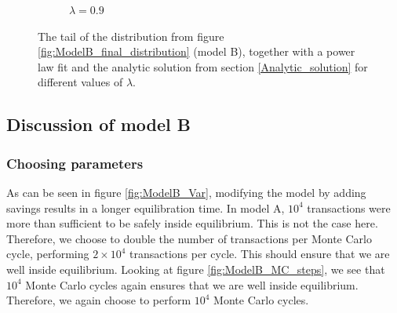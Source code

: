 \documentclass[a4paper, 10pt]{article}
\begin{document}
\begin{figure}[!ht]
\begin{subfigure}[H!]{0.5\textwidth}
        \caption{$\lambda = 0.9$}\label{fig:ModelB_tail_lamb_09}
    \end{subfigure}
\caption{The tail of the distribution from figure \ref{fig:ModelB_final_distribution} (model B), together with a power law fit and the analytic solution from section \ref{Analytic_solution} for different values of $\lambda$.}\label{fig:ModelB_tail}
\end{figure} 

\subsection{Discussion of model B}
\subsubsection{Choosing parameters}
As can be seen in figure \ref{fig:ModelB_Var}, modifying the model by adding savings results in a longer equilibration time. In model A, $10^4$ transactions were more than sufficient to be safely inside equilibrium. This is not the case here. Therefore, we choose to double the number of transactions per Monte Carlo cycle, performing $2\times 10^4$ transactions per cycle. This should ensure that we are well inside equilibrium. Looking at figure \ref{fig:ModelB_MC_steps}, we see that $10^4$ Monte Carlo cycles again ensures that we are well inside equilibrium. Therefore, we again choose to perform $10^4$ Monte Carlo cycles.
\end{document}
